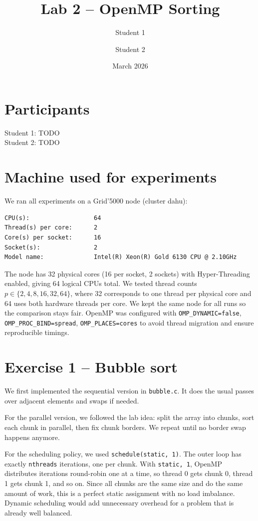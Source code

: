 \documentclass[11pt,a4paper]{article}
\title{Lab 2 -- OpenMP Sorting}
\author{Student 1 \and Student 2}
\date{March 2026}
\begin{document}
\maketitle

\section{Participants}
Student 1: TODO\\
Student 2: TODO

\section{Machine used for experiments}
We ran all experiments on a Grid'5000 node (cluster dahu):

\begin{verbatim}
CPU(s):                  64
Thread(s) per core:      2
Core(s) per socket:      16
Socket(s):               2
Model name:              Intel(R) Xeon(R) Gold 6130 CPU @ 2.10GHz
\end{verbatim}

The node has 32 physical cores (16 per socket, 2 sockets) with Hyper-Threading enabled, giving 64 logical CPUs total.
We tested thread counts $p \in \{2, 4, 8, 16, 32, 64\}$, where 32 corresponds to one thread per physical core and 64 uses both hardware threads per core.
We kept the same node for all runs so the comparison stays fair.
OpenMP was configured with \texttt{OMP\_DYNAMIC=false}, \texttt{OMP\_PROC\_BIND=spread}, \texttt{OMP\_PLACES=cores} to avoid thread migration and ensure reproducible timings.

\section{Exercise 1 -- Bubble sort}
We first implemented the sequential version in \texttt{bubble.c}. It does the usual passes over adjacent elements and swaps if needed.

For the parallel version, we followed the lab idea: split the array into chunks, sort each chunk in parallel, then fix chunk borders. We repeat until no border swap happens anymore.

For the scheduling policy, we used \texttt{schedule(static, 1)}. The outer loop has exactly \texttt{nthreads} iterations, one per chunk. With \texttt{static, 1}, OpenMP distributes iterations round-robin one at a time, so thread 0 gets chunk 0, thread 1 gets chunk 1, and so on. Since all chunks are the same size and do the same amount of work, this is a perfect static assignment with no load imbalance. Dynamic scheduling would add unnecessary overhead for a problem that is already well balanced.
\end{document}
